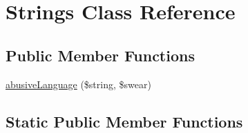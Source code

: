 \hypertarget{class_strings}{\section{Strings Class Reference}
\label{class_strings}
}
\subsection*{Public Member Functions}
\begin{DoxyCompactItemize}
\item 
\hyperlink{class_strings_acb3dd2fe257ccf1d38b033acc7102246}{abusive\-Language} (\$string, \$swear)
\end{DoxyCompactItemize}
\subsection*{Static Public Member Functions}
